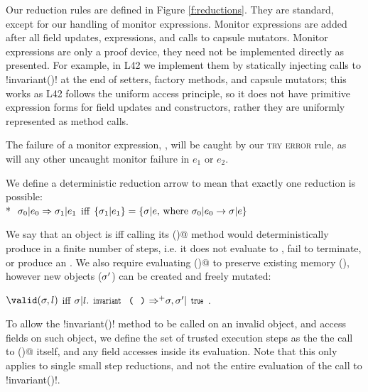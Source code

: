 Our reduction rules are defined in Figure \ref{f:reductions}.
They are standard, except for our handling of monitor expressions. Monitor expressions are added after all field updates, \Q@new@ expressions, and calls to capsule mutators.
Monitor expressions are only a proof device, they need not be implemented directly as presented.
For example, in L42 we implement them by statically injecting calls to \Q!invariant()! at the end of setters, factory methods, and capsule mutators; this works as L42 follows the uniform access principle, so it does not have primitive expression forms for field updates and constructors, rather they are uniformly represented as method calls.

The failure of a monitor expression, , will be caught by our \textsc{try error} rule, as will any other uncaught monitor failure in $e_1$ or $e_2$.

We define a deterministic reduction arrow to mean that exactly one reduction is possible:\\*
\indent$\ \sigma_0|e_0\Rightarrow \sigma_1|e_1$ iff $\{\sigma_1|e_1\}=\{\sigma|e \text{, where } \sigma_0|e_0\rightarrow \sigma|e\}$

\noindent We say that an object is \valid iff calling its \Q@invariant()@ method would
deterministically produce \Q@true@ in a finite number of steps, i.e. it does not evaluate to \Q@false@, fail to terminate, or produce an \error.
We also require evaluating \Q@invariant()@ to preserve existing memory (\s), however new objects ($\sigma'$) can be created and freely mutated:

\indent$\valid(\s,l)$ iff $\s | l.\invariant {\Rightarrow^+} \s,\s' | \Kw{true}$.%

\noindent 
To allow the \Q!invariant()! method to be called on an invalid object, and access fields on such object, we define the set of trusted execution steps as the the call to \Q@invariant()@ itself, and any field accesses inside its evaluation. Note that this only applies to single small step reductions, and not the entire evaluation of the call to \Q!invariant()!.

